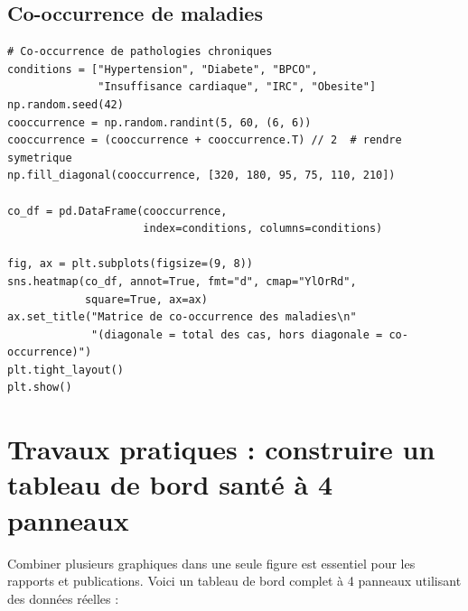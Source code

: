 \subsection{Co-occurrence de maladies}

\begin{verbatim}
# Co-occurrence de pathologies chroniques
conditions = ["Hypertension", "Diabete", "BPCO",
              "Insuffisance cardiaque", "IRC", "Obesite"]
np.random.seed(42)
cooccurrence = np.random.randint(5, 60, (6, 6))
cooccurrence = (cooccurrence + cooccurrence.T) // 2  # rendre symetrique
np.fill_diagonal(cooccurrence, [320, 180, 95, 75, 110, 210])

co_df = pd.DataFrame(cooccurrence,
                     index=conditions, columns=conditions)

fig, ax = plt.subplots(figsize=(9, 8))
sns.heatmap(co_df, annot=True, fmt="d", cmap="YlOrRd",
            square=True, ax=ax)
ax.set_title("Matrice de co-occurrence des maladies\n"
             "(diagonale = total des cas, hors diagonale = co-occurrence)")
plt.tight_layout()
plt.show()
\end{verbatim}

\section{Travaux pratiques : construire un tableau de bord sant\'e \`a 4 panneaux}

Combiner plusieurs graphiques dans une seule figure est essentiel pour les rapports et publications. Voici un tableau de bord complet \`a 4 panneaux utilisant des donn\'ees r\'eelles :

